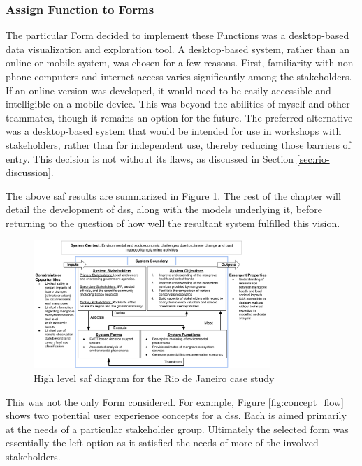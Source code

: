 \subsubsection{Assign Function to Forms}

The particular Form decided to implement these Functions was a desktop-based data visualization and exploration tool. A desktop-based system, rather than an online or mobile system, was chosen for a few reasons. First, familiarity with non-phone computers and internet access varies significantly among the stakeholders. If an online version was developed, it would need to be easily accessible and intelligible on a mobile device. This was beyond the abilities of myself and other teammates, though it remains an option for the future. The preferred alternative was a desktop-based system that would be intended for use in workshops with stakeholders, rather than for independent use, thereby reducing those barriers of entry. This decision is not without its flaws, as discussed in Section \ref{sec:rio-discussion}. 

The above \ac{saf} results are summarized in Figure \ref{fig:system-diagram-rio}. The rest of the chapter will detail the development of \ac{dss}, along with the models underlying it, before returning to the question of how well the resultant system fulfilled this vision.

\begin{figure}[!htb] 
\centering
\includegraphics[width=0.8\textwidth]{Figures/chap4/system-diagram-rio.png}
\caption[High level SAF diagram for the Rio de Janeiro case study]{High level \ac{saf} diagram for the Rio de Janeiro case study}
\label{fig:system-diagram-rio}
\end{figure}

This was not the only Form considered. For example, Figure \ref{fig:concept_flow} shows two potential user experience concepts for a \ac{dss}. Each is aimed primarily at the needs of a particular stakeholder group. Ultimately the selected form was essentially the left option as it satisfied the needs of more of the involved stakeholders. 

